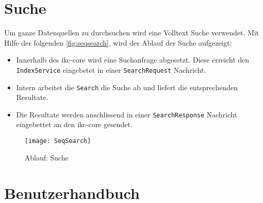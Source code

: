 \section{Suche}
Um ganze Datenquellen zu durchsuchen wird eine Volltext Suche verwendet. Mit Hilfe der folgenden \autoref{fig:seqsearch}, wird der Ablauf der Suche aufgezeigt:
\begin{itemize}
    \item Innerhalb des \gls{ikc-core} wird eine Suchanfrage abgesetzt. Diese erreicht den \texttt{IndexService} eingebetet in einer \texttt{SearchRequest} Nachricht. 
    \item Intern arbeitet die \texttt{Search} die Suche ab und liefert die entsprechenden Resultate.
    \item Die Resultate werden anschlissend in einer \texttt{SearchResponse} Nachricht eingebettet an den \gls{ikc-core} gesendet.
\end{itemize}

    \begin{figure}[H]
    \centering
    \texttt{[image: SeqSearch]}
    \caption{Ablauf: Suche}
    \label{fig:seqsearch}
    \end{figure}




\section{Benutzerhandbuch}